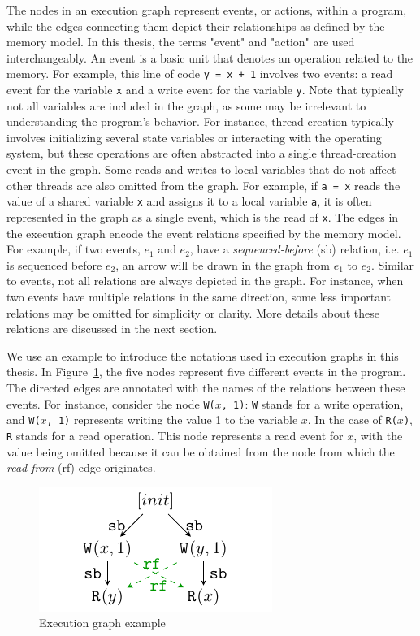 The nodes in an execution graph represent events, or actions, within a program, while the edges connecting them depict their relationships as defined by the memory model. In this thesis, the terms "event" and "action" are used interchangeably. An event is a basic unit that denotes an operation related to the memory. For example, this line of code \texttt{y = x + 1} involves two events: a read event for the variable \texttt{x} and a write event for the variable \texttt{y}. Note that typically not all variables are included in the graph, as some may be irrelevant to understanding the program's behavior. For instance, thread creation typically involves initializing several state variables or interacting with the operating system, but these operations are often abstracted into a single thread-creation event in the graph. Some reads and writes to local variables that do not affect other threads are also omitted from the graph. For example, if \texttt{a = x} reads the value of a shared variable \texttt{x} and assigns it to a local variable \texttt{a}, it is often represented in the graph as a single event, which is the read of \texttt{x}. The edges in the execution graph encode the event relations specified by the memory model. For example, if two events, $e_1$ and $e_2$, have a \textit{sequenced-before} (sb) relation, i.e. $e_1$ is sequenced before $e_2$, an arrow will be drawn in the graph from $e_1$ to $e_2$. Similar to events, not all relations are always depicted in the graph. For instance, when two events have multiple relations in the same direction, some less important relations may be omitted for simplicity or clarity. More details about these relations are discussed in the next section.




We use an example to introduce the notations used in execution graphs in this thesis. In Figure~\ref{graph-example}, the five nodes represent five different events in the program. The directed edges are annotated with the names of the relations between these events. For instance, consider the node \texttt{W($x$, 1)}: \texttt{W} stands for a write operation, and \texttt{W($x$, 1)} represents writing the value 1 to the variable \texttt{$x$}. In the case of \texttt{R($x$)}, \texttt{R} stands for a read operation. This node represents a read event for \texttt{$x$}, with the value being omitted because it can be obtained from the node from which the \textit{read-from} (rf) edge originates.

\begin{figure}[h!tbp]
	\centering
	\includegraphics[scale=1.3]{figure/exec-graph/example.pdf} 
	\caption{Execution graph example} 
	\label{graph-example} 
\end{figure}







